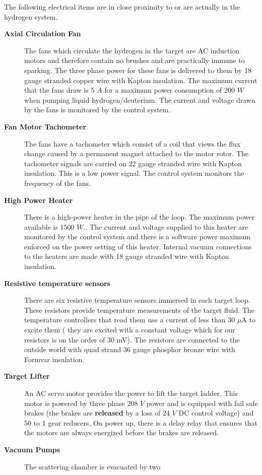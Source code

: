 \begin{safetyen}{0}{0}
{The following electrical items are in close proximity to or are actually
in the hydrogen system.
\begin{description}
\item [{\bf Axial Circulation Fan}] The fans which circulate the hydrogen
in the target are AC induction motors and therefore contain no brushes
and are practically immune to sparking. The three phase power for
these fans is delivered to them by 18 gauge stranded copper wire with
Kapton insulation. The maximum current that the fans draw is 5 $A$
for a maximum power consumption of 200 $W$ when pumping liquid hydrogen/deuterium.
The current and voltage drawn by the fans is monitored by the control
system. 
\item [{\bf Fan Motor Tachometer}] The fans have a tachometer which consist
of a coil that views the flux change caused by a permanent magnet
attached to the motor rotor. The tachometer signals are carried on
22 gauge stranded wire with Kapton insulation. This is a low power
signal. The control system monitors the frequency of the fans. 
\item [{\bf High Power Heater}] There is a high-power heater in the pipe
of the loop. The maximum power available is 1500 $W$.. The current
and voltage supplied to this heater are monitored by the control system
and there is a software power maximum enforced on the power setting
of this heater. Internal vacuum connections to the heaters are made
with 18 gauge stranded wire with Kapton insulation. 
\item [{\bf Resistive temperature sensors}] There are six resistive temperature
sensors immersed in each target loop. These resistors provide temperature
measurements of the target fluid. The temperature controllers that
read them use a current of less than 30 $\mu$A to excite them ( they
are excited with a constant voltage which for our resistors is on
the order of 30 mV). The resistors are connected to the outside world
with quad strand 36 gauge phosphor bronze wire with Formvar insulation. 
\item [{\bf Target Lifter}] An AC servo motor provides the power to lift
the target ladder. This motor is powered by three phase 208 $V$ power
and is equipped with fail safe brakes (the brakes are \textbf{released}
by a loss of 24 $V$ DC control voltage) and 50 to 1 gear reducers.
On power up, there is a delay relay that ensures that the motors are
always energized before the brakes are released. 
\item [{\bf Vacuum Pumps}] The scattering chamber is evacuated by two

\end{description}}
\end{safetyen}
